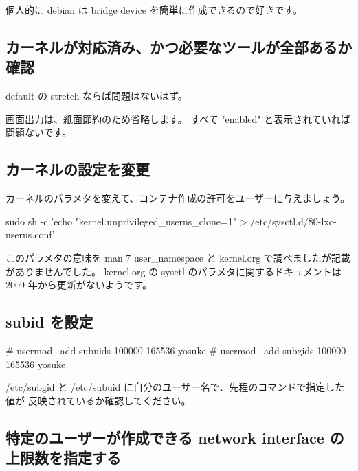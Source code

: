 \documentclass[mingoth,a4paper]{jsarticle}
\begin{document}
個人的に debian は bridge device を簡単に作成できるので好きです。

\subsection{カーネルが対応済み、かつ必要なツールが全部あるか確認}
default の stretch ならば問題はないはず。


画面出力は、紙面節約のため省略します。
すべて "enabled" と表示されていれば問題ないです。

\subsection{カーネルの設定を変更}

カーネルのパラメタを変えて、コンテナ作成の許可をユーザーに与えましょう。

\begin{commandline}
sudo sh -c 'echo "kernel.unprivileged_userns_clone=1" > /etc/sysctl.d/80-lxc-userns.conf'
\end{commandline}

このパラメタの意味を man 7 user\_namespace と kernel.org で調べましたが記載がありませんでした。
kernel.org の sysctl のパラメタに関するドキュメントは 2009 年から更新がないようです。

\subsection{subid を設定}

\begin{commandline}
# usermod --add-subuids 100000-165536 yosuke
# usermod --add-subgids 100000-165536 yosuke
\end{commandline}

/etc/subgid と /etc/subuid に自分のユーザー名で、先程のコマンドで指定した値が
反映されているか確認してください。

\subsection{特定のユーザーが作成できる network interface の上限数を指定する}
\end{document}
